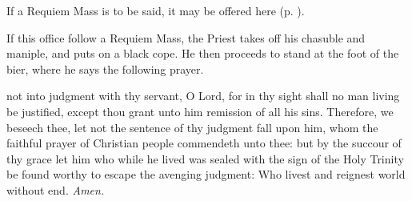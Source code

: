 \begin{rubric}
    If a Requiem Mass is to be said, it may be offered here (p. \pageref{RequiemMasses}).
\end{rubric}


\begin{rubric}
	If this office follow a Requiem Mass, the Priest takes off his chasuble and maniple, and puts on a black cope. He then proceeds to stand at the foot of the bier, where he says the following prayer.
\end{rubric}

 not into judgment with thy servant, O Lord, for in thy sight shall no man living be justified, except thou grant unto him remission of all his sins. Therefore, we beseech thee, let not the sentence of thy judgment fall upon him, whom the faithful prayer of Christian people commendeth unto thee: but by the succour of thy grace let him who while he lived was sealed with the sign of the Holy Trinity be found worthy to escape the avenging judgment: Who livest and reignest world without end. \textit{Amen.}

